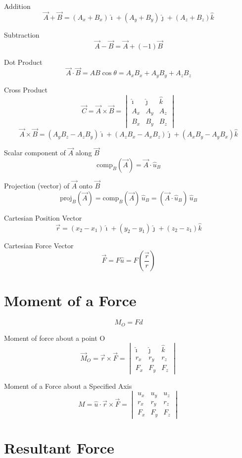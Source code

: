 \documentclass[11pt, titlepage]{article} %
\begin{document}
Addition
\[
\vec{A} + \vec{B} = (A_x+B_x)\hat{\imath} + (A_y+B_y)\hat{\jmath} + (A_z+B_z)\hat{k}
\]

Subtraction
\[
\vec{A} - \vec{B} = \vec{A} + (-1)\vec{B}
\]

Dot Product
\[
\vec{A} \cdot \vec{B} = AB\cos\theta = A_xB_x + A_yB_y + A_zB_z
\]

Cross Product
\[
\vec{C} = \vec{A} \times \vec{B} =
\begin{vmatrix}
\hat{\imath} & \hat{\jmath} & \hat{k} \\
A_x & A_y & A_z \\
B_x & B_y & B_z
\end{vmatrix}
\]
\[
\vec{A} \times \vec{B} = (A_yB_z - A_zB_y)\hat{\imath} + (A_zB_x - A_xB_z)\hat{\jmath} + (A_xB_y - A_yB_x)\hat{k}
\]

Scalar component of $\vec{A}$ along $\vec{B}$
\[
\text{comp}_B(\vec{A}) = \vec{A} \cdot \hat{u}_B
\]

Projection (vector) of $\vec{A}$ onto $\vec{B}$
\[
\text{proj}_B(\vec{A}) = \text{comp}_B(\vec{A})\,\hat{u}_B = (\vec{A} \cdot \hat{u}_B)\,\hat{u}_B
\]

Cartesian Position Vector
\[
\vec{r} = (x_2 - x_1)\hat{\imath} + (y_2 - y_1)\hat{\jmath} + (z_2 - z_1)\hat{k}
\]

Cartesian Force Vector
\[
\vec{F} = F\hat{u} = F\left(\frac{\vec{r}}{r}\right)
\]

\section{Moment of a Force}
\[
M_O = Fd
\]

Moment of force about a point O
\[
\vec{M}_O = \vec{r} \times \vec{F} =
\begin{vmatrix}
\hat{\imath} & \hat{\jmath} & \hat{k} \\
r_x & r_y & r_z \\
F_x & F_y & F_z
\end{vmatrix}
\]

Moment of a Force about a Specified Axis
\[
M = \hat{u} \cdot \vec{r} \times \vec{F} =
\begin{vmatrix}
u_x & u_y & u_z \\
r_x & r_y & r_z \\
F_x & F_y & F_z
\end{vmatrix}
\]

\section{Resultant Force}
\end{document}
